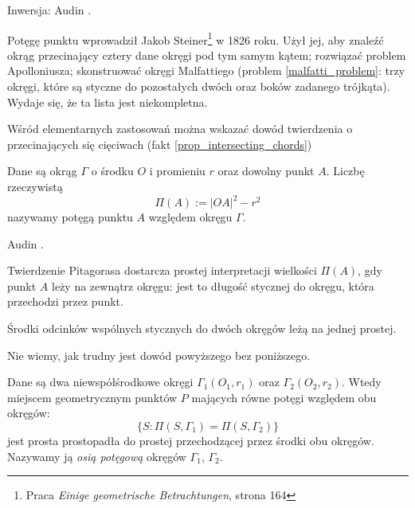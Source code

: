 
Inwersja: Audin \cite[s. 84]{audin_2003}.


Potęgę punktu wprowadził Jakob Steiner\footnote{Praca \emph{Einige geometrische Betrachtungen}, strona 164} w 1826 roku.
%
Użył jej, aby znaleźć okrąg przecinający cztery dane okręgi pod tym samym kątem; rozwiązać problem Apolloniusza; skonstruować okręgi Malfattiego (problem \ref{malfatti_problem}: trzy okręgi, które są styczne do pozostałych dwóch oraz boków zadanego trójkąta).
%
%
Wydaje się, że ta lista jest niekompletna.

Wśród elementarnych zastosowań można wskazać dowód twierdzenia o przecinających się cięciwach (fakt \ref{prop_intersecting_chords})

\begin{definition}
	\label{def_power_point}
	Dane są okrąg $\Gamma$ o środku $O$ i promieniu $r$ oraz dowolny punkt $A$.
	Liczbę rzeczywistą
	\begin{equation}
		\Pi(A) := |OA|^2 - r^2
	\end{equation}
	nazywamy potęgą punktu $A$ względem okręgu $\Gamma$.
\end{definition}

Audin \cite[s. 89]{audin_2003}.

Twierdzenie Pitagorasa dostarcza prostej interpretacji wielkości $\Pi(A)$, gdy punkt $A$ leży na zewnątrz okręgu: jest to długość stycznej do okręgu, która przechodzi przez punkt.

\begin{proposition}
	Środki odcinków wspólnych stycznych do dwóch okręgów leżą na jednej prostej. %
\end{proposition}

Nie wiemy, jak trudny jest dowód powyższego bez poniższego.

\begin{proposition}
\label{guzicki_6_11}%
    Dane są dwa niewspółśrodkowe okręgi $\Gamma_1(O_1, r_1)$ oraz $\Gamma_2(O_2, r_2)$.
    Wtedy miejscem geometrycznym punktów $P$ mających równe potęgi względem obu okręgów:
	\begin{equation}
		\{S : \Pi(S, \Gamma_1) = \Pi(S, \Gamma_2)\}
	\end{equation}
	jest prosta prostopadła do prostej przechodzącej przez środki obu okręgów.
	Nazywamy ją \emph{osią potęgową} okręgów $\Gamma_1$, $\Gamma_2$.
\end{proposition}

